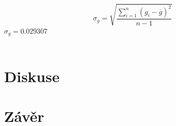 \documentclass{article}
\begin{document}
$$\sigma_{g} = \sqrt{\frac{\sum^{n}_{i=1}(g_{i} - \overline{g})^{2}}{n-1}}$$
$\sigma_{g} = 0.029307$
\\
\vspace{1em}
\\
\section{Diskuse}
\section{Závěr}
\end{document}
